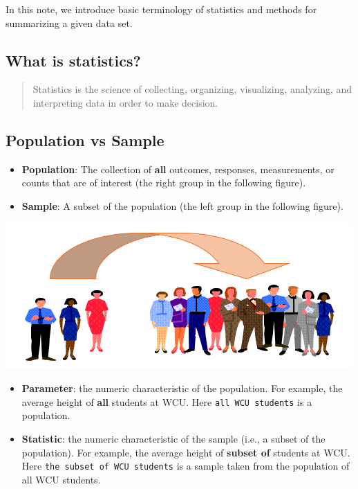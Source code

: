 \documentclass[
]{book}
\begin{document}
In this note, we introduce basic terminology of statistics and methods for summarizing a given data set.

\hypertarget{what-is-statistics}{%
\subsection{What is statistics?}\label{what-is-statistics}}

\begin{quote}
Statistics is the science of collecting, organizing, visualizing, analyzing, and interpreting data in order to make decision.
\end{quote}

\hypertarget{population-vs-sample}{%
\subsection{Population vs Sample}\label{population-vs-sample}}

\begin{itemize}
\item
  \textbf{Population}: The collection of \textbf{all} outcomes, responses, measurements, or counts that are of interest (the right group in the following figure).
\item
  \textbf{Sample}: A subset of the population (the left group in the following figure).
\end{itemize}

\begin{center}\includegraphics[width=0.6\linewidth]{week01/popSample} \end{center}

\begin{itemize}
\item
  \textbf{Parameter}: the numeric characteristic of the population. For example, the average height of \textbf{all} students at WCU. Here \texttt{all\ WCU\ students} is a population.
\item
  \textbf{Statistic}: the numeric characteristic of the sample (i.e., a subset of the population). For example, the average height of \textbf{subset of} students at WCU. Here \texttt{the\ subset\ of\ WCU\ students} is a sample taken from the population of all WCU students.
\end{itemize}
\end{document}
